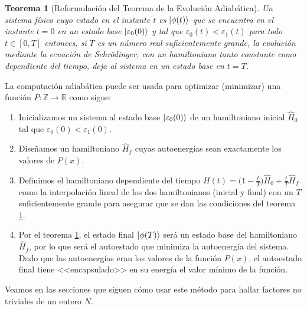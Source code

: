 \documentclass[11pt, spanish]{report}
\numberwithin{equation}{section}
\newtheorem{teo}[defin]{Teorema}
\numberwithin{defin}{section}
\newenvironment{yellowBox}{\begin{tcolorbox}[colback=yellow!5!white,colframe=yellow!75!black]}{\end{tcolorbox}}
\begin{document}
\begin{yellowBox}
\begin{teo}[Reformulación del Teorema de la Evolución Adiabática]\label{TeoAdiab} Un sistema físico cuyo estado en el instante $t$ es $\ket{\phi(t)}$ que se encuentra en el instante $t=0$ en un estado base $\ket{\varepsilon_0(0)}$ y tal que $\varepsilon_0(t)<\varepsilon_1(t)$ para todo $t\in [0,T]$ entonces, si $T$ es un número real suficientemente grande, la evolución mediante la ecuación de Schrödinger, con un hamiltoniano tanto constante como dependiente del tiempo, deja al sistema en un estado base\footnotemark{} en $t=T$.
\end{teo}
\end{yellowBox}


La computación adiabática puede ser usada para optimizar (minimizar) una función $P:\mathbb{Z}\rightarrow\mathbb{R}$ como sigue:

\begin{enumerate}
\item Inicializamos un sistema al estado base $\ket{\varepsilon_0(0)}$ de un hamiltoniano inicial $\hat{H}_0$ tal que $\varepsilon_0(0)<\varepsilon_1(0)$.
\item Diseñamos un hamiltoniano $\hat{H}_f$ cuyas autoenergías sean exactamente los valores de $P(x)$.
\item Definimos el hamiltoniano dependiente del tiempo $H(t)=\Big(1-\frac{t}{T}\Big)\hat{H}_0+\frac{t}{T}\hat{H}_f$ como la interpolación lineal de los dos hamiltonianos (inicial y final) con un $T$ suficientemente grande para asegurar que se dan las condiciones del teorema \ref{TeoAdiab}.
\item Por el teorema \ref{TeoAdiab}, el estado final $\ket{\phi(T)}$ será un estado base del hamiltoniano $\hat{H}_f$, por lo que será el autoestado que minimiza la autoenergía del sistema. Dado que las autoenergías eran los valores de la función $P(x)$, el autoestado final tiene <<encapsulado>> en su energía el valor mínimo de la función.
\end{enumerate}

Veamos en las secciones que siguen cómo usar este método para hallar factores no triviales de un entero $N$.
\end{document}
